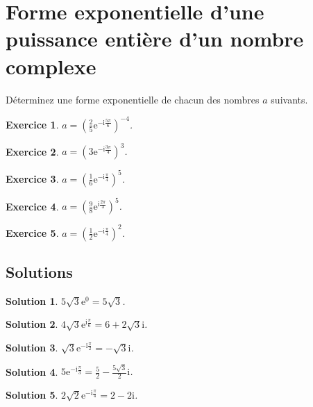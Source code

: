 \documentclass[a4paper]{article}
\newtheorem{Exercice}{Exercice}
\newtheorem{solution}{Solution}
\begin{document}
\begin{minipage}{0.45\linewidth}
  \section*{Forme exponentielle d'une puissance enti\`ere d'un nombre complexe}%
     D\'eterminez une forme exponentielle de chacun des nombres $a$ suivants.\begin{Exercice}
$\displaystyle a=\left(\frac{2}{5}\mathrm{e}^{-\mathrm{i}\frac{5 \pi }{6}}\right)^{-4}$.
\end{Exercice}
\begin{Exercice}
$\displaystyle a=\left(3\mathrm{e}^{-\mathrm{i}\frac{3 \pi }{4}}\right)^{3}$.
\end{Exercice}
\begin{Exercice}
$\displaystyle a=\left(\frac{1}{6}\mathrm{e}^{-\mathrm{i}\frac{\pi }{4}}\right)^{5}$.
\end{Exercice}
\begin{Exercice}
$\displaystyle a=\left(\frac{9}{8}\mathrm{e}^{\mathrm{i}\frac{2 \pi }{3}}\right)^{5}$.
\end{Exercice}
\begin{Exercice}
$\displaystyle a=\left(\frac{1}{2}\mathrm{e}^{-\mathrm{i}\frac{\pi }{4}}\right)^{2}$.
\end{Exercice}
\end{minipage}







\newpage
\subsection*{Solutions}
\begin{solution}
$\displaystyle 5 \sqrt{3}\mathrm{e}^{0}=5 \sqrt{3}$.\end{solution}
\begin{solution}
$\displaystyle 4 \sqrt{3}\mathrm{e}^{\mathrm{i}\frac{\pi }{6}}=6+2 \sqrt{3}\mathrm{i}$.\end{solution}
\begin{solution}
$\displaystyle \sqrt{3}\mathrm{e}^{-\mathrm{i}\frac{\pi }{2}}=-\sqrt{3}\mathrm{i}$.\end{solution}
\begin{solution}
$\displaystyle 5\mathrm{e}^{-\mathrm{i}\frac{\pi }{3}}=\frac{5}{2}-\frac{5 \sqrt{3}}{2}\mathrm{i}$.\end{solution}
\begin{solution}
$\displaystyle 2 \sqrt{2}\mathrm{e}^{-\mathrm{i}\frac{\pi }{4}}=2-2\mathrm{i}$.\end{solution}
\end{document}
